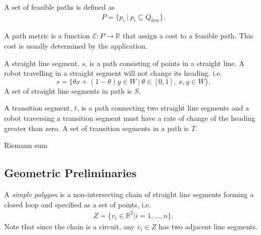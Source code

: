 \documentclass[../main.tex]{subfiles}
\begin{document}
\begin{definition}
A set of feasible paths is defined as
	\begin{equation}
	\begin{aligned}
		P=\{p_i\ |\ p_i\subseteq Q_{\text{free}}\}.
	\end{aligned}
	\end{equation}
\end{definition}

\begin{definition}
A path metric is a function $\mathcal{E}:P\to\mathbb{R}$ that assign a cost to a feasible path. This cost is usually determined by the application.
\end{definition}

\begin{definition}
A straight line segment, $s$, is a path consisting of points in a straight line. A robot travelling in a straight segment will not change its heading. i.e.
	\begin{equation}
		s=\{\theta x+(1-\theta)y\in W\ |\ \theta\in[0,1],\ x,y\in W\}.
	\end{equation}
A set of straight line segments in path is $S$.
\end{definition}

\begin{definition}
A transition segment, $t$, is a path connecting two straight line segments and a robot traversing a transition segment must have a rate of change of the heading greater than zero. A set of transition segments in a path is $T$.
\end{definition}

Riemann sum

\subsection{Geometric Preliminaries}
\begin{definition}
A \emph{simple polygon} is a non-intersecting chain of straight line segments forming a closed loop and specified as a set of points, i.e.
	\begin{equation}
	\begin{aligned}
		Z=\{v_i\in\mathbb{R}^2|i=1,\ldots,n\}.
	\end{aligned}
	\end{equation}
Note that since the chain is a circuit, any $v_i\in Z$ has two adjacent line segments. 
\end{definition}
\end{document}
